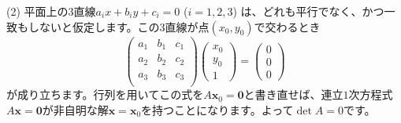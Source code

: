 \noindent (2) 平面上の$3$直線$a_i x + b_i y + c_i = 0$ ($i = 1, 2, 3$) は、どれも平行でなく、かつ一致もしないと仮定します。この$3$直線が点$(x_0, y_0)$で交わるとき
\[
\begin{pmatrix}
a_1 & b_1 & c_1 \\
a_2 & b_2 & c_2 \\
a_3 & b_3 & c_3 \\
\end{pmatrix}
\begin{pmatrix}
x_0 \\
y_0 \\
1
\end{pmatrix}
=
\begin{pmatrix}
0 \\
0 \\
0
\end{pmatrix}
\]
が成り立ちます。行列を用いてこの式を$A\bm{x}_0 = \bm{0}$と書き直せば、連立$1$次方程式$A\bm{x} = \bm{0}$が非自明な解$\bm{x} = \bm{x}_0$を持つことになります。よって$\det A = 0$です。

